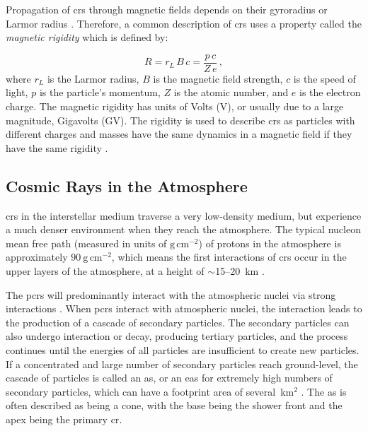 Propagation of \glspl{cr} through magnetic fields depends on their gyroradius or Larmor radius \citep{particle_data_group_review_2020}. Therefore, a common description of \glspl{cr} uses a property called the {\textit{magnetic rigidity}} which is defined by:

\begin{equation}
\label{eq:rigidity}
R = r_L \, B \, c = \frac{p \, c}{Z \, e} \, ,
\end{equation}
%
where $r_L$ is the Larmor radius, $B$ is the magnetic field strength, $c$ is the speed of light, $p$ is the particle's momentum, $Z$ is the atomic number, and $e$ is the electron charge. The magnetic rigidity has units of Volts (V), or usually due to a large magnitude, Gigavolts (GV). The rigidity is used to describe \glspl{cr} as particles with different charges and masses have the same dynamics in a magnetic field if they have the same rigidity \citep{particle_data_group_review_2020}.



\subsection{Cosmic Rays in the Atmosphere}
\label{sec:air_shower}

\glspl{cr} in the interstellar medium traverse a very low-density medium, but experience a much denser environment when they reach the atmosphere. The typical nucleon mean free path (measured in units of $\mathrm{g}\,\mathrm{cm}^{-2}$) of protons in the atmosphere is approximately $90~\mathrm{g}\,\mathrm{cm}^{-2}$, which means the first interactions of \glspl{cr} occur in the upper layers of the atmosphere, at a height of $\sim$15--20~km \citep{grupen_astroparticle_2005}. %

The \glspl{pcr} will predominantly interact with the atmospheric nuclei via strong interactions \citep{grupen_astroparticle_2005}. When \glspl{pcr} interact with atmospheric nuclei, the interaction leads to the production of a cascade of secondary particles. The secondary particles can also undergo interaction or decay, producing tertiary particles, and the process continues until the energies of all particles are insufficient to create new particles. If a concentrated and large number of secondary particles reach ground-level, the cascade of particles is called an \gls{as}, or an \gls{eas} for extremely high numbers of secondary particles, which can have a footprint area of several~km$^2$ \citep{fokkema_hisparc_2012, van_dam_hisparc_2020}. The \gls{as} is often described as being a cone, with the base being the shower front and the apex being the primary \gls{cr}.

